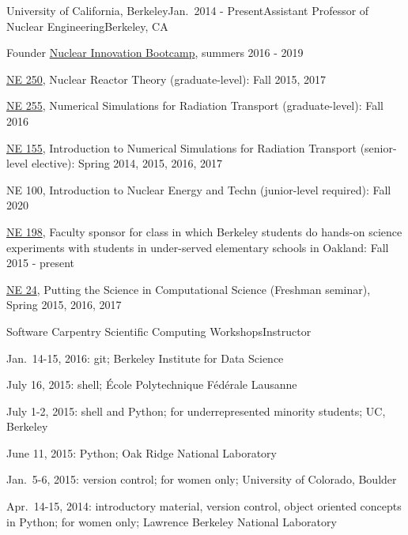 \begin{rSubsection}{University of California, Berkeley}{Jan.\ 2014 - Present}{Assistant Professor of Nuclear Engineering}{Berkeley, CA}
\item Founder \href{http://nuclearinnovationalliance.org/bootcamp}{Nuclear
Innovation Bootcamp}, summers 2016 - 2019 
\item \href{https://github.com/rachelslaybaugh/NE250 }{NE 250}, Nuclear Reactor Theory (graduate-level): Fall 2015, 2017
\item \href{https://github.com/rachelslaybaugh/NE255}{NE 255}, Numerical Simulations for Radiation Transport (graduate-level): Fall 2016
\item \href{https://github.com/rachelslaybaugh/NE155}{NE 155}, Introduction to Numerical Simulations for Radiation Transport (senior-level elective): Spring 2014, 2015, 2016, 2017
\item NE 100, Introduction to Nuclear Energy and Techn (junior-level required):
Fall 2020 
\item \href{http://soesberkeley.weebly.com/}{NE 198}, Faculty sponsor for class
in which Berkeley students do hands-on science experiments with students in
under-served elementary schools in Oakland: Fall 2015 - present
\item \href{https://github.com/rachelslaybaugh/NE24}{NE 24}, Putting the Science in Computational Science (Freshman seminar), Spring 2015, 2016, 2017
\end{rSubsection}


\begin{rSubsection}{Software Carpentry Scientific Computing Workshops}{}{Instructor}{}
\item Jan.\ 14-15, 2016: git; Berkeley Institute for Data Science
\item July 16, 2015: shell; \'{E}cole Polytechnique F\'{e}d\'{e}rale Lausanne
\item July 1-2, 2015: shell and Python; for underrepresented minority students; UC, Berkeley
\item June 11, 2015: Python; Oak Ridge National Laboratory
\item Jan.\ 5-6, 2015: version control; for women only; University of Colorado, Boulder
\item Apr.\ 14-15, 2014: introductory material, version control, object oriented concepts in Python; for women only; Lawrence Berkeley National Laboratory
\end{rSubsection}


